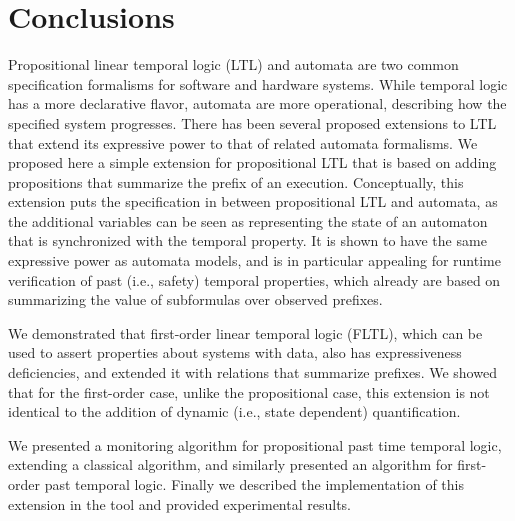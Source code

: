 
\section{Conclusions}

Propositional linear temporal logic (LTL) and automata are two common specification formalisms for software and hardware systems. While temporal logic has a more declarative
flavor, automata are more operational, describing how the specified system
progresses. There has been several proposed extensions to LTL that extend
its expressive power to that of related automata formalisms. We proposed here
a simple extension for propositional LTL that is based on adding propositions that summarize the prefix of an execution. Conceptually, this extension puts the specification in between propositional LTL and automata, as the additional
variables can be seen as representing the state of an automaton
that is synchronized with the temporal property. It is shown to have
the same expressive power as automata models, and is in particular
appealing for runtime verification of past (i.e., safety) temporal properties,
which already are based on summarizing the value of subformulas over
observed prefixes.

We demonstrated that first-order linear temporal logic (FLTL), which
can be used to assert properties about systems with data, also has expressiveness deficiencies, and extended it with relations that summarize prefixes.
We showed that for the first-order case, unlike the propositional case,
this extension is not identical to the addition of dynamic (i.e., state dependent) quantification.

We presented a monitoring
algorithm for propositional past time temporal logic, extending a classical algorithm, and similarly presented an algorithm for 
first-order past temporal logic.
Finally we described the implementation of this extension in the \dejavu{} tool and provided experimental results.
